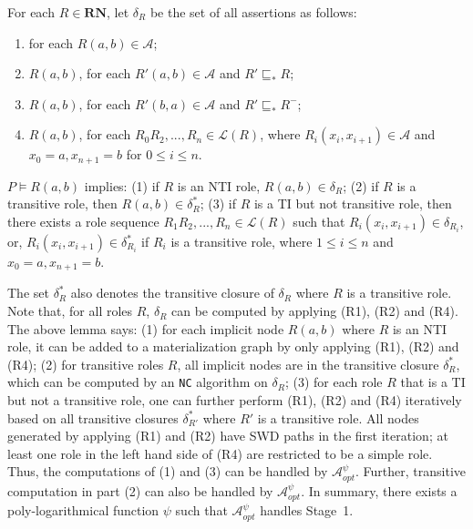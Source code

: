 \documentclass[final,1p,times]{elsarticle}
\begin{document}
\begin{definition}\label{def:deltaRdhlplus}
For each $R\in\textbf{RN}$, let $\delta_R$ be the set of all assertions as follows:
\begin{enumerate}[leftmargin=4ex,label=\arabic*.]
\item for each $R(a,b)\in\mathcal{A}$;
\item $R(a,b)$, for each $R'(a,b)\in\mathcal{A}$ and $R'\sqsubseteq_{*}R$;
\item $R(a,b)$, for each $R'(b,a)\in\mathcal{A}$ and $R'\sqsubseteq_{*}R^-$;
\item $R(a,b)$, for each $R_0R_2,...,R_n\in\mathcal{L}(R)$, where $R_i(x_i,x_{i+1})\in\mathcal{A}$ and $x_0=a, x_{n+1}=b$ for $0\leq i\leq n$.
\end{enumerate}
\end{definition}

\begin{lemma}\label{lemma:tiplus}
$P\models R(a,b)$ implies: (1) if $R$ is an NTI role, $R(a,b)\in\delta_R$;
(2) if $R$ is a transitive role, then $R(a,b)\in\delta^*_R$;
(3) if $R$ is a TI but not transitive role, then there exists a role sequence $R_1R_2,...,R_n\in\mathcal{L}(R)$ such that
$R_i(x_i,x_{i+1})\in\delta_{R_i}$, or, $R_i(x_i,x_{i+1})\in\delta^*_{R_i}$ if $R_i$ is a transitive role,
where $1\leq i\leq n$ and $x_0=a, x_{n+1}=b$.
\end{lemma}

The set $\delta^*_R$ also denotes the transitive closure of $\delta_R$ where $R$ is a transitive role.
Note that, for all roles $R$, $\delta_R$ can be computed by applying (R1), (R2) and (R4).
The above lemma says:
(1) for each implicit node $R(a,b)$ where $R$ is an NTI role,
it can be added to a materialization graph by only applying (R1), (R2) and (R4);
(2) for transitive roles $R$, all implicit nodes are in the transitive closure $\delta^*_{R}$,
which can be computed by an \texttt{NC} algorithm on $\delta_{R}$;
(3) for each role $R$ that is a TI but not a transitive role,
one can further perform (R1), (R2) and (R4) iteratively based on all
transitive closures $\delta^*_{R'}$ where $R'$ is a transitive role.
All nodes generated by applying (R1) and (R2) have SWD paths in the first iteration; at
least one role in the left hand side of (R4) are restricted to be a simple role.
Thus, the computations of (1) and (3) can be handled by $\mathcal{A}_{opt}^\psi$.
Further, transitive computation in part (2) can also be handled by $\mathcal{A}_{opt}^\psi$.
In summary, there exists a poly-logarithmical function $\psi$
such that $\mathcal{A}_{opt}^\psi$ handles Stage~1.
\end{document}

